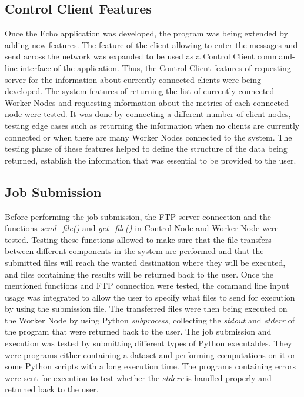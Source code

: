 \documentclass[10pt]{report}
\begin{document}
\subsection*{Control Client Features}
Once the Echo application was developed, the program was being extended by adding new features. The feature of the client allowing to enter the messages and send across the network was expanded to be used as a Control Client command-line interface of the application. Thus, the Control Client features of requesting server for the information about currently connected clients were being developed. The system features of returning the list of currently connected Worker Nodes and requesting information about the metrics of each connected node were tested. It was done by connecting a different number of client nodes, testing edge cases such as returning the information when no clients are currently connected or when there are many Worker Nodes connected to the system. The testing phase of these features helped to define the structure of the data being returned, establish the information that was essential to be provided to the user.

\subsection*{Job Submission}
Before performing the job submission, the FTP server connection and the functions \textit{send\_file()} and \textit{get\_file()} in Control Node and Worker Node were tested. Testing these functions allowed to make sure that the file transfers between different components in the system are performed and that the submitted files will reach the wanted destination where they will be executed, and files containing the results will be returned back to the user. Once the mentioned functions and FTP connection were tested, the command line input usage was integrated to allow the user to specify what files to send for execution by using the submission file. The transferred files were then being executed on the Worker Node by using Python \textit{subprocess}, collecting the \textit{stdout} and \textit{stderr} of the program that were returned back to the user. The job submission and execution was tested by submitting different types of Python executables. They were programs either containing a dataset and performing computations on it or some Python scripts with a long execution time. The programs containing errors were sent for execution to test whether the \textit{stderr} is handled properly and returned back to the user.
\end{document}
